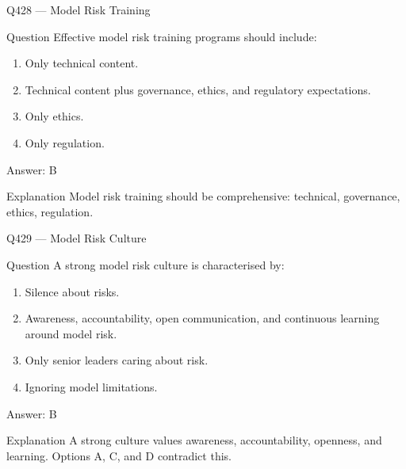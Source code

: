 \documentclass[aspectratio=169,8pt]{beamer}
\begin{document}
	\begin{frame}{Q428 --- Model Risk Training}
		\begin{block}{Question}
			Effective model risk training programs should include:
			\begin{enumerate}
				\item Only technical content.
				\item Technical content plus governance, ethics, and regulatory expectations.
				\item Only ethics.
				\item Only regulation.
			\end{enumerate}
		\end{block}
		\begin{exampleblock}{Answer: B}\end{exampleblock}
		\begin{block}{Explanation}
			Model risk training should be comprehensive: technical, governance, ethics, regulation.
		\end{block}
	\end{frame}
	
	\begin{frame}{Q429 --- Model Risk Culture}
		\begin{block}{Question}
			A strong model risk culture is characterised by:
			\begin{enumerate}
				\item Silence about risks.
				\item Awareness, accountability, open communication, and continuous learning around model risk.
				\item Only senior leaders caring about risk.
				\item Ignoring model limitations.
			\end{enumerate}
		\end{block}
		\begin{exampleblock}{Answer: B}\end{exampleblock}
		\begin{block}{Explanation}
			A strong culture values awareness, accountability, openness, and learning. Options A, C, and D contradict this.
		\end{block}
	\end{frame}
	
\end{document}
